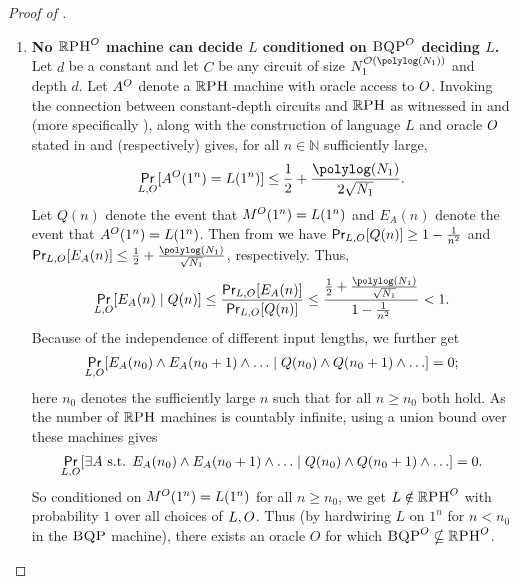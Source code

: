 \documentclass{article}
\begin{document}
\begin{proof}[Proof of ]
\begin{enumerate}
    \item \label{Item:NoPHmachine} \textbf{No $\mathbb{R}\textsc{PH}^{O}$ machine can decide $L$ conditioned on $\textsc{BQP}^{O}$ deciding $L$.} Let $d$ be a constant and let $C$ be any circuit of size $N_1^{\bigO(\polylog(N_1))}$ and depth $d$. Let $A^O$ denote a $\mathbb{R}\textsc{PH}$ machine with oracle access to $O$. Invoking the connection between constant-depth circuits and $\mathbb{R}\textsc{PH}$ as witnessed in  and  (more specifically ), along with the construction of language $L$ and oracle $O$ stated in  and  (respectively) gives, for all $n \in \mathbb{N}$ sufficiently large,
    \begin{equation}
    \label{eq:BehaviourOfPHmachine}
    \probability_{L,\oracle{O}} [A^{\oracle{O}}(1^n)=L(1^n)] \leq \frac{1}{2}+\frac{\polylog(N_1)}{2\sqrt{N_1}}.
    \end{equation}
    Let $Q(n)$ denote the event that $M^{O}(1^n)=L(1^n)$ and $E_A(n)$ denote the event that $A^{O}(1^n)=L(1^n)$. Then from  we have 
     $\operatorname*{\textsf{Pr}}_{L, O}[Q(n)] \geq 1 -\frac{1}{n^2}$ and $\probability_{L, \oracle{O}}[E_A(n)] \leq \frac{1}{2} + \frac{\polylog(N_1)}{\sqrt{N_1}}$, respectively. Thus,
     \begin{equation*}
         \probability_{L, \oracle{O}} [E_A(n) \mid Q(n)] \leq \frac{\probability_{L, \oracle{O}} [E_A(n)]}{\probability_{L, \oracle{O}} [Q(n)]} \leq \frac{\frac{1}{2} + \frac{\polylog(N_1)}{\sqrt{N_1}}} {1 -\frac{1}{n^2}}< 1.
     \end{equation*}
    Because of the independence of different input lengths, we further get
    \begin{equation*}
         \operatorname*{\textsf{Pr}}_{L, O} [E_A(n_0) \land E_A(n_0+1) \land \ldots  \mid Q(n_0) \land Q(n_0 +1) \land \ldots] =0;
     \end{equation*}
     here $n_0$ denotes the sufficiently large $n$ such that for all $n\geq n_0$ both  hold. As the number of $\mathbb{R}\textsc{PH}$ machines is countably infinite, using a union bound over these machines gives
     \begin{equation*}
         \operatorname*{\textsf{Pr}}_{L, O} [\exists A \text{ s.t. } E_A(n_0) \land E_A(n_0+1) \land \ldots  \mid Q(n_0) \land Q(n_0 +1) \land \ldots] =0.
     \end{equation*}
     So conditioned on $M^{O}(1^n)=L(1^n)$ for all $n \geq n_0$, we get $L \notin \mathbb{R}\textsc{PH}^{O}$ with probability $1$ over all choices of $L, O$. Thus (by hardwiring $L$ on $1^n$ for $n < n_0$ in the $\textsc{BQP}$ machine), there exists an oracle $O$ for which $\textsc{BQP}^{O} \nsubseteq \mathbb{R}\textsc{PH}^{O}$.\qedhere
\end{enumerate}
\end{proof}
\end{document}
